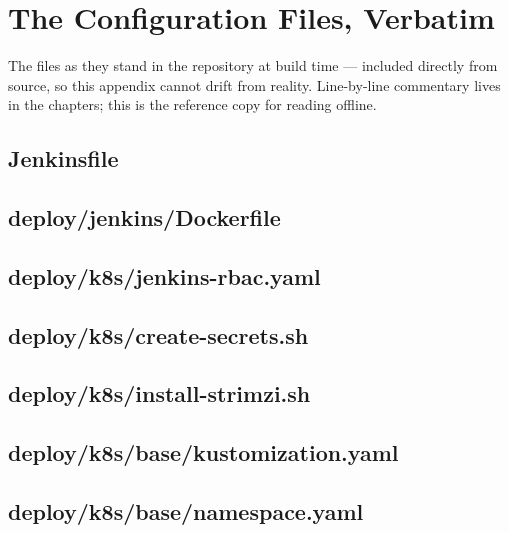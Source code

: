 \chapter{The Configuration Files, Verbatim}
\label{app:listings}

The files as they stand in the repository at build time --- included
directly from source, so this appendix cannot drift from reality.
Line-by-line commentary lives in the chapters; this is the reference
copy for reading offline.

\lstset{basicstyle=\ttfamily\scriptsize}

\section*{Jenkinsfile}


\section*{deploy/jenkins/Dockerfile}


\section*{deploy/k8s/jenkins-rbac.yaml}


\section*{deploy/k8s/create-secrets.sh}


\section*{deploy/k8s/install-strimzi.sh}


\section*{deploy/k8s/base/kustomization.yaml}


\section*{deploy/k8s/base/namespace.yaml}


